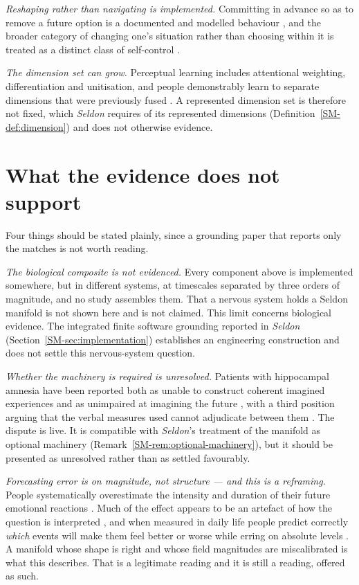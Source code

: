 \documentclass[11pt,a4paper]{article}
\theoremstyle{remark}
\begin{document}
\emph{Reshaping rather than navigating is implemented.} Committing in advance so as to remove a
future option is a documented and modelled behaviour \citep{rachlin1972,ainslie1975}, and the
broader category of changing one's situation rather than choosing within it is treated as a distinct
class of self-control \citep{duckworth2016}.

\emph{The dimension set can grow.} Perceptual learning includes attentional weighting, differentiation
and unitisation, and people demonstrably learn to separate dimensions that were previously fused
\citep{goldstone1998,goldstone2001}. A represented dimension set is therefore not fixed, which
\emph{Seldon} requires of its represented dimensions (Definition~\ref{SM-def:dimension}) and does not
otherwise evidence.

\section{What the evidence does not support}\label{sec:limits}
Four things should be stated plainly, since a grounding paper that reports only the matches is not
worth reading.

\emph{The biological composite is not evidenced.} Every component above is implemented somewhere, but in
different systems, at timescales separated by three orders of magnitude, and no study assembles them.
That a nervous system holds a Seldon manifold is not shown here and is not claimed.
This limit concerns biological evidence. The integrated finite software grounding
reported in \emph{Seldon} (Section~\ref{SM-sec:implementation}) establishes an
engineering construction and does not settle this nervous-system question.

\emph{Whether the machinery is required is unresolved.} Patients with hippocampal amnesia have been
reported both as unable to construct coherent imagined experiences \citep{hassabis2007} and as
unimpaired at imagining the future \citep{squire2010}, with a third position arguing that the verbal
measures used cannot adjudicate between them \citep{miloyan2019}. The dispute is live. It is
compatible with \emph{Seldon}'s treatment of the manifold as optional machinery
(Remark~\ref{SM-rem:optional-machinery}), but it should be presented as unresolved rather than as
settled favourably.

\emph{Forecasting error is on magnitude, not structure --- and this is a reframing.} People
systematically overestimate the intensity and duration of their future emotional reactions
\citep{gilbert1998,wilsongilbert2005}. Much of the effect appears to be an artefact of how the
question is interpreted \citep{levine2012}, and when measured in daily life people predict correctly
\emph{which} events will make them feel better or worse while erring on absolute levels
\citep{moeck2026}. A manifold whose shape is right and whose field magnitudes are miscalibrated is
what this describes. That is a legitimate reading and it is still a reading, offered as such.
\end{document}
